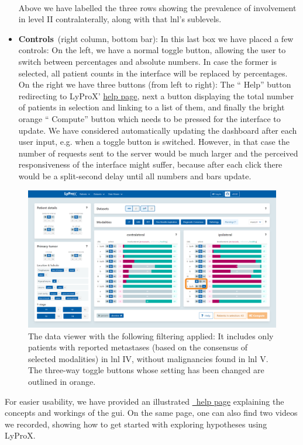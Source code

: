 \documentclass[\relativeRoot/main.tex]{subfiles}
\begin{document}
\begin{itemize}
\\
    [3mm]
    Above we have labelled the three rows showing the prevalence of involvement in level II contralaterally, along with that \gls{lnl}'s sublevels.
    \item \textbf{Controls}~(right column, bottom bar): In this last box we have placed a few controls: On the left, we have a normal toggle button, allowing the user to switch between percentages and absolute numbers. In case the former is selected, all patient counts in the interface will be replaced by percentages. On the right we have three buttons (from left to right): The `` Help'' button redirecting to LyProX' \href{https://lyprox/dashboard/help}{help page}, next a button displaying the total number of patients in selection and linking to a list of them, and finally the bright orange `` Compute'' button which needs to be pressed for the interface to update. We have considered automatically updating the dashboard after each user input, e.g. when a toggle button is switched. However, in that case the number of requests sent to the server would be much larger and the perceived responsiveness of the interface might suffer, because after each click there would be a split-second delay until all numbers and bars update.
\end{itemize}

\begin{figure}
    \centering
    \includegraphics[width=1.0\textwidth, frame]{figures/data_viewer_lnl_example.png}
    \caption[
        The data viewer showing a scenario of two involved LNLs
    ]{
        The data viewer with the following filtering applied: It includes only patients with reported metastases (based on the consensus of selected modalities) in \gls{lnl} IV, without malignancies found in \gls{lnl} V. The three-way toggle buttons whose setting has been changed are outlined in orange.
    }
    \label{fig:lyprox:data_viewer_lnl_example}
\end{figure}

For easier usability, we have provided an illustrated \href{https://lyprox.org/dashboard/help}{~help page} explaining the concepts and workings of the \gls{gui}. On the same page, one can also find two videos we recorded, showing how to get started with exploring hypotheses using LyProX.
\end{document}

